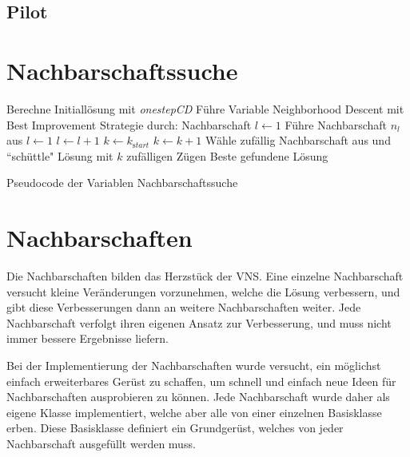\subsection{Pilot}


\section{Nachbarschaftssuche}
\label{sec:impl:vns}

\begin{algorithm}
\begin{algorithmic}[1]
\State Berechne Initiallösung mit \emph{onestepCD}
\State Führe Variable Neighborhood Descent mit Best Improvement Strategie durch:
\State Nachbarschaft $l \leftarrow 1$
\State Führe Nachbarschaft $n_l$ aus
\State  $l\leftarrow 1$  
\Else
\State  $l\leftarrow l + 1$
\EndIf
\EndWhile
{}
\State $k \leftarrow k_{\mathrm start}$ 
\Else
\State $k \leftarrow k + 1$
\EndIf
\State Wähle zufällig Nachbarschaft aus und ``schüttle" Lösung mit $k$ zufälligen Zügen
\EndWhile
\State\Return Beste gefundene Lösung
\end{algorithmic}
\caption{Pseudocode der Variablen Nachbarschaftssuche}
\end{algorithm}

\section{Nachbarschaften}
Die Nachbarschaften bilden das Herzstück der VNS. Eine einzelne Nachbarschaft versucht kleine Veränderungen vorzunehmen, welche die Lösung verbessern, und gibt diese Verbesserungen dann an weitere Nachbarschaften weiter.
Jede Nachbarschaft verfolgt ihren eigenen Ansatz zur Verbesserung, und muss nicht immer bessere Ergebnisse liefern. 

Bei der Implementierung der Nachbarschaften wurde versucht, ein möglichst einfach erweiterbares Gerüst zu schaffen, um schnell und einfach neue Ideen für Nachbarschaften ausprobieren zu können. Jede Nachbarschaft
wurde daher als eigene Klasse implementiert, welche aber alle von einer einzelnen Basisklasse erben. Diese Basisklasse definiert ein Grundgerüst, welches von jeder Nachbarschaft ausgefüllt werden muss. 

